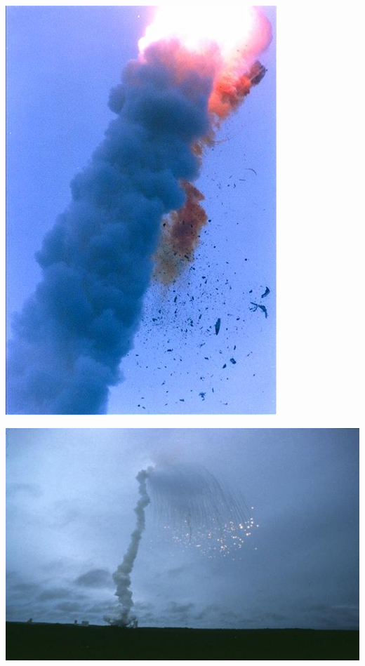 \documentclass[12pt]{article}
\begin{document}
	\begin{minipage}{0.24\textwidth}
		\centering
		\includegraphics[width=0.9\linewidth]{010_ArianeExplosion1.jpg}
	\end{minipage}
	\begin{minipage}{0.5\textwidth}
		\centering
		\includegraphics[width=0.9\linewidth]{011_ArianeExplosion3.jpg}
	\end{minipage}
		
\end{document}
